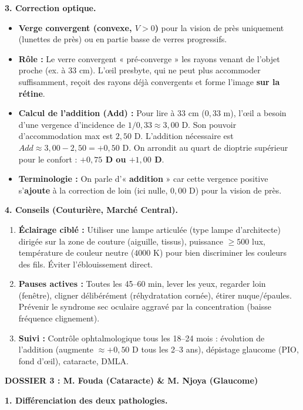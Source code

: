 \documentclass[11pt]{article}
\begin{document}
\begin{exoresolu}
\textbf{3. Correction optique.}
\begin{itemize}
    \item \textbf{Verge convergent (convexe, $V > 0$)} pour la vision de près uniquement (lunettes de près) ou en partie basse de verres progressifs.
    \item \textbf{Rôle :} Le verre convergent « pré-converge » les rayons venant de l'objet proche (ex. à $33$ cm). L'œil presbyte, qui ne peut plus accommoder suffisamment, reçoit des rayons déjà convergents et forme l'image \textbf{sur la rétine}.
    \item \textbf{Calcul de l'addition (Add) :} Pour lire à $33$ cm ($0,33$ m), l'œil a besoin d'une vergence d'incidence de $1/0,33 \approx 3,00$ D. Son pouvoir d'accommodation max est $2,50$ D. L'addition nécessaire est $Add \approx 3,00 - 2,50 = +0,50$ D. On arrondit au quart de dioptrie supérieur pour le confort : \textbf{$+0,75$ D ou $+1,00$ D}.
    \item \textbf{Terminologie :} On parle d'« \textbf{addition} » car cette vergence positive s'\textbf{ajoute} à la correction de loin (ici nulle, $0,00$ D) pour la vision de près.
\end{itemize}

\textbf{4. Conseils (Couturière, Marché Central).}
\begin{enumerate}
    \item \textbf{Éclairage ciblé :} Utiliser une lampe articulée (type lampe d'architecte) dirigée sur la zone de couture (aiguille, tissus), puissance $\ge 500$ lux, température de couleur neutre ($4000$ K) pour bien discriminer les couleurs des fils. Éviter l'éblouissement direct.
    \item \textbf{Pauses actives :} Toutes les 45--60 min, lever les yeux, regarder loin (fenêtre), cligner délibérément (réhydratation cornée), étirer nuque/épaules. Prévenir le syndrome sec oculaire aggravé par la concentration (baisse fréquence clignement).
    \item \textbf{Suivi :} Contrôle ophtalmologique tous les 18--24 mois : évolution de l'addition (augmente $\approx +0,50$ D tous les 2--3 ans), dépistage glaucome (PIO, fond d'œil), cataracte, DMLA.
\end{enumerate}

\vspace{0.5cm}
\noindent\textbf{DOSSIER 3 : M. Fouda (Cataracte) \& M. Njoya (Glaucome)}

\textbf{1. Différenciation des deux pathologies.}


\end{exoresolu}
\end{document}

